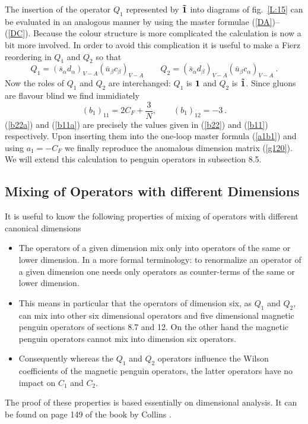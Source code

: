 \documentclass[12pt,rotate]{article}
\newcommand{\be}{\begin{equation}}
\newcommand{\ee}{\end{equation}}
\newcommand{\bi}{\begin{itemize}}
\newcommand{\ei}{\end{itemize}}
\begin{document}
\begin{itemize}
\begin{itemize}
\begin{itemize}
The insertion of the operator $Q_1$ represented by ${\bf \tilde 1}$
into diagrams of fig.~\ref{L:15} can be evaluated in an analogous manner
by using the master formulae (\ref{DA})--(\ref{DC}). Because the
colour structure is more complicated the calculation is now a bit more
involved. In order to avoid this complication it is useful to
make a Fierz reordering in $Q_1$ and $Q_2$ so that
\be\label{fierz}
Q_1=(\bar s_\alpha d_\alpha)_{V-A}(\bar u_\beta c_\beta)_{V-A}\quad\quad
Q_2=(\bar s_\alpha d_\beta)_{V-A}(\bar u_\beta c_\alpha)_{V-A}~.
\ee
Now the roles of $Q_1$ and $Q_2$ are interchanged: $Q_1$ is ${\bf 1}$
and $Q_2$ is ${\bf\tilde 1}$. Since gluons are flavour blind we
find immidiately
\be\label{b11a}
(b_1)_{11}=2 C_F+\frac{3}{N},
\quad\quad
(b_1)_{12}=-3~.
\ee
(\ref{b22a}) and (\ref{b11a}) are precisely the values given in 
(\ref{b22}) and (\ref{b11}) respectively.
Upon
inserting them into the one-loop master formula (\ref{a1b1}) and using
$a_1=-C_F$ we finally
reproduce the anomalous dimension matrix 
(\ref{g120}). We will extend this calculation to penguin operators in
subsection 8.5. 

\subsection{Mixing of Operators with different Dimensions}
It is useful to know the following properties of mixing of operators
with different canonical dimensions
\bi
\item
The operators of a given dimension mix only into operators of the
same or lower dimension. In a more formal terminology: to
renormalize an operator of a given dimension one needs only 
operators as counter-terms of the same or lower dimension.
\item
This means in particular that the operators of dimension six,
as $Q_1$ and $Q_2$, can mix into other six dimensional operators
and five dimensional magnetic penguin operators of sections 8.7 and 12.
On the other hand the magnetic penguin operators cannot mix into
dimension six operators.
\item
Consequently whereas the $Q_1$ and $Q_2$ operators influence the
Wilson coefficients of the magnetic penguin operators, the
latter operators have no impact on $C_1$ and $C_2$.
\ei

The proof of these properties is based essentially on dimensional
analysis. It can be found on page 149 of the book by Collins 
\cite{Collins}.


\end{itemize}
\end{itemize}
\end{itemize}
\end{document}
